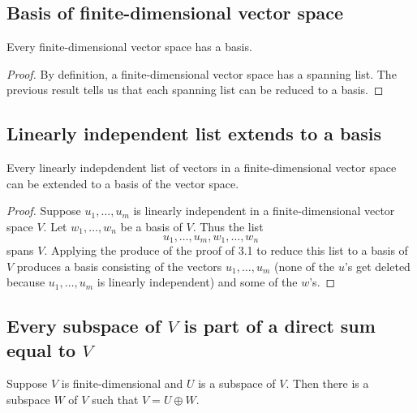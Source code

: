 \documentclass[11pt]{article}
\begin{document}
    \subsection{Basis of finite-dimensional vector space}

    Every finite-dimensional vector space has a basis.

    \begin{proof}
        By definition, a finite-dimensional vector space has a spanning list. The previous result tells us that each spanning list can be reduced to a basis.
    \end{proof}

    \subsection{Linearly independent list extends to a basis}

    Every linearly indepdendent list of vectors in a finite-dimensional vector space can be extended to a basis of the vector space.

    \begin{proof}
        Suppose \(u_1, \dots, u_m\) is linearly independent in a finite-dimensional vector space $V$. Let \(w_1, \dots, w_n\) be a basis of $V$. Thus the list \[u_1, \dots, u_m, w_1, \dots, w_n\] spans $V$. Applying the produce of the proof of 3.1 to reduce this list to a basis of $V$ produces a basis consisting of the vectors \(u_1, \dots, u_m\) (none of the $u$'s get deleted because \(u_1, \dots, u_m\) is linearly independent) and some of the $w$'s.
    \end{proof}

    \subsection{Every subspace of $V$ is part of a direct sum equal to $V$}

    Suppose $V$ is finite-dimensional and $U$ is a subspace of $V$. Then there is a subspace $W$ of $V$ such that \(V = U \oplus W\).
\end{document}
